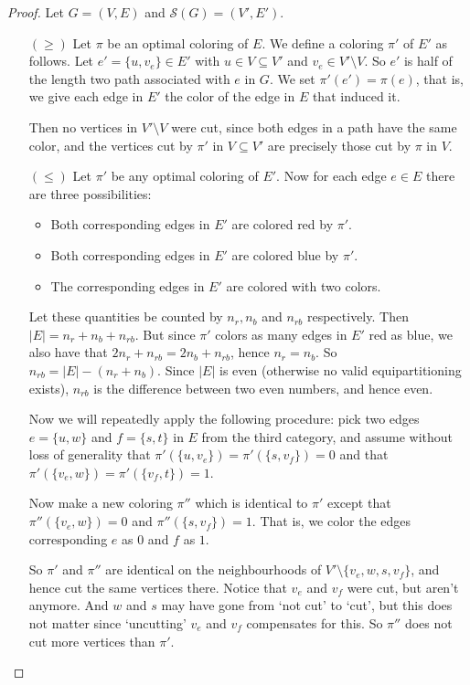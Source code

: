 \documentclass{article}
\begin{document}
	\begin{proof}
		Let $G = (V, E)$ and $\mathcal{S}(G) = (V', E')$.
		\begin{enumerate}
			\item[$(\geq)$] Let $\pi$ be an optimal coloring of $E$. We define
					a coloring $\pi'$ of $E'$ as follows. Let
					$e' = \{u, v_e\} \in E'$ with $u \in V \subseteq V'$ and
					$v_e \in V' \setminus V$. So $e'$ is half of the length two
					path associated with $e$ in $G$. We set
					$\pi'(e') = \pi(e)$, that is, we give each edge in $E'$ the
					color of the edge in $E$ that induced it.

					Then no vertices in $V'\setminus V$ were cut, since
					both edges in a path have the same color, and the vertices
					cut by $\pi'$ in $V \subseteq V'$ are precisely those
					cut by $\pi$ in $V$.
			\item[$(\leq)$] Let $\pi'$ be any optimal coloring of $E'$. Now for
					each edge $e \in E$ there are three possibilities:
					\begin{itemize}
						\item Both corresponding edges in $E'$ are colored red
							by $\pi'$.
						\item Both corresponding edges in $E'$ are colored blue
							by $\pi'$.
						\item The corresponding edges in $E'$ are colored with
							two colors.
					\end{itemize}
					Let these quantities be counted by $n_r, n_b$ and $n_{rb}$
					respectively. Then $|E| = n_r + n_b + n_{rb}$. But since
					$\pi'$ colors as many edges in $E'$ red as blue, we also
					have that $2n_r + n_{rb} = 2n_b + n_{rb}$, hence
					$n_r = n_b$. So $n_{rb} = |E| - (n_r + n_b)$. Since $|E|$
					is even (otherwise no valid equipartitioning exists),
					$n_{rb}$ is the difference between two even numbers, and
					hence even.

					Now we will repeatedly apply the following procedure: pick
					two edges $e = \{u, w\}$ and $f = \{s, t\}$ in $E$
					from the third category, and assume
					without loss of generality that
					$\pi'(\{u, v_e\}) = \pi'(\{s, v_f\}) = 0$ and that
					$\pi'(\{v_e, w\}) = \pi'(\{v_f, t\}) = 1$.

					Now make a new coloring $\pi''$ which is identical to
					$\pi'$ except that $\pi''(\{v_e, w\}) = 0$ and
					$\pi''(\{s, v_f\}) = 1$. That is, we color the edges
					corresponding $e$ as $0$ and $f$ as $1$.

					So $\pi'$ and $\pi''$ are identical on the neighbourhoods
					of $V' \setminus \{ v_e, w, s, v_f\}$, and hence cut the
					same vertices there. Notice that $v_e$ and $v_f$ were cut,
					but
					aren't anymore. And $w$ and $s$ may have gone from
					`not cut' to `cut',
					but this does not matter since `uncutting' $v_e$ and $v_f$
					compensates for this. So $\pi''$ does not cut more
					vertices than $\pi'$.


\end{enumerate}
\end{proof}
\end{document}
